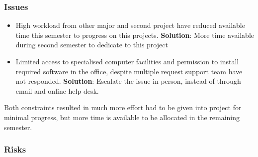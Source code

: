 \documentclass[11pt]{article}
\begin{document}
\subsubsection{Issues}\label{issues}


\begin{itemize}
    \item High workload from other major and second project have reduced available time this semester to progress on this projects. \newline
    \textbf{Solution}: More time available during second semester to dedicate to this project
    \item Limited access to specialised computer facilities and permission to install required software in the office, despite multiple request support team have not responded. \newline
    \textbf{Solution}: Escalate the issue in person, instead of through email and online help desk. 
\end{itemize}

Both constraints resulted in much more effort had to be given into project for minimal progress, but more time is available to be allocated in the remaining semester.

\subsubsection{Risks}\label{risks}

\end{document}
